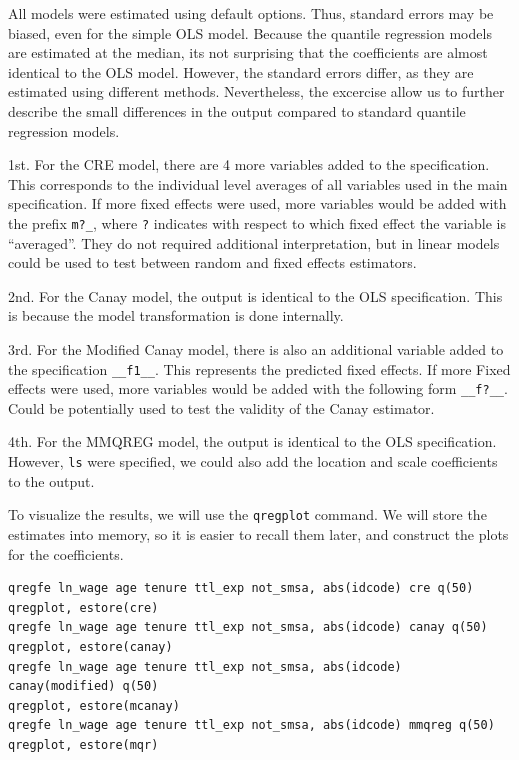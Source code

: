 \documentclass[bib]{statapress}
\begin{document}
All models were estimated using default options. Thus, standard errors
may be biased, even for the simple OLS model. Because the quantile
regression models are estimated at the median, its not surprising that
the coefficients are almost identical to the OLS model. However, the
standard errors differ, as they are estimated using different methods.
Nevertheless, the excercise allow us to further describe the small
differences in the output compared to standard quantile regression
models.

1st. For the CRE model, there are 4 more variables added to the
specification. This corresponds to the individual level averages of all
variables used in the main specification. If more fixed effects were
used, more variables would be added with the prefix \texttt{m?\_}, where
\texttt{?} indicates with respect to which fixed effect the variable is
``averaged''. They do not required additional interpretation, but in
linear models could be used to test between random and fixed effects
estimators.

2nd. For the Canay model, the output is identical to the OLS
specification. This is because the model transformation is done
internally.

3rd. For the Modified Canay model, there is also an additional variable
added to the specification \texttt{\_\_f1\_\_}. This represents the
predicted fixed effects. If more Fixed effects were used, more variables
would be added with the following form \texttt{\_\_f?\_\_}. Could be
potentially used to test the validity of the Canay estimator.

4th. For the MMQREG model, the output is identical to the OLS
specification. However, \texttt{ls} were specified, we could also add
the location and scale coefficients to the output.

To visualize the results, we will use the \texttt{qregplot} command. We
will store the estimates into memory, so it is easier to recall them
later, and construct the plots for the coefficients.

\begin{verbatim}
qregfe ln_wage age tenure ttl_exp not_smsa, abs(idcode) cre q(50)
qregplot, estore(cre)
qregfe ln_wage age tenure ttl_exp not_smsa, abs(idcode) canay q(50)
qregplot, estore(canay)
qregfe ln_wage age tenure ttl_exp not_smsa, abs(idcode) canay(modified) q(50)
qregplot, estore(mcanay)
qregfe ln_wage age tenure ttl_exp not_smsa, abs(idcode) mmqreg q(50) 
qregplot, estore(mqr)
\end{verbatim}
\end{document}
